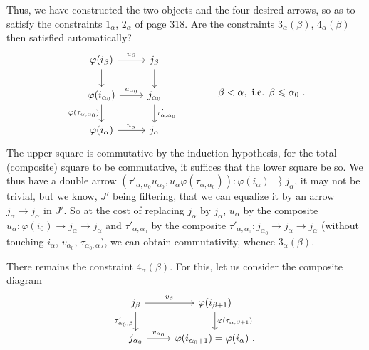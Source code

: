 \documentclass[11pt]{article}
\newcommand{\msp}[1]{\marginpar{\footnotesize [#1]}}
\begin{document}
Thus, we have constructed the two objects and the four desired arrows, so as to satisfy the constraints $1_\alpha$, $2_\alpha$ of page 318. Are the constraints $3_\alpha(\beta)$, $4_\alpha(\beta)$ then satisfied automatically?
\[
\begin{tikzcd}
\varphi(i_\beta) \arrow[r, "u_\beta"] \arrow[d] & j_\beta \arrow[d] \\
\varphi(i_{\alpha_0}) \arrow[r, "u_{\alpha_0}"] \arrow[d, "\varphi(\tau_{\alpha,\alpha_0})"'] & j_{\alpha_0} \arrow[d, "\tau'_{\alpha,\alpha_0}"] \\
\varphi(i_\alpha) \arrow[r, "u_\alpha"] & j_\alpha
\end{tikzcd}
\qquad\qquad \beta<\alpha, \text{ i.e. } \beta\leqslant\alpha_0\ .
\]
The upper square is commutative by the induction hypothesis, for the total (composite) square to be commutative, it suffices that the lower square be so. We thus have a double arrow $(\tau'_{\alpha,\alpha_0}u_{\alpha_0},u_\alpha\varphi(\tau_{\alpha,\alpha_0})):\varphi(i_\alpha)\rightrightarrows j_\alpha$, it may not be trivial, but we know, $J'$ being filtering, that we can equalize it by an arrow $j_\alpha\longrightarrow\bar{j}_\alpha$ in $J'$. So at the cost of replacing $j_\alpha$ by %
\msp{page 324}
$\bar{j}_\alpha$, $u_\alpha$ by the composite $\bar{u}_\alpha:\varphi(i_0)\longrightarrow j_\alpha\longrightarrow\bar{j}_\alpha$ and $\tau'_{\alpha,\alpha_0}$ by the composite $\bar{\tau}'_{\alpha,\alpha_0}:j_{\alpha_0}\longrightarrow j_\alpha\longrightarrow\bar{j}_\alpha$ (without touching $i_\alpha$, $v_{\alpha_0}$, $\tau_{\alpha_0,\alpha}$), we can obtain commutativity, whence $3_\alpha(\beta)$. %

There remains the constraint $4_\alpha(\beta)$. For this, let us consider the composite diagram
\[
\begin{tikzcd}
j_\beta \arrow[r, "v_\beta"] \arrow[d, "\tau'_{\alpha_0,\beta}"'] & \varphi(i_{\beta+1}) \arrow[d, "\varphi(\tau_{\alpha,\beta+1})"] \\
j_{\alpha_0} \arrow[r, "v_{\alpha_0}"] & \varphi(i_{\alpha_0+1})=\varphi(i_\alpha)\ .
\end{tikzcd}
\]
\end{document}
